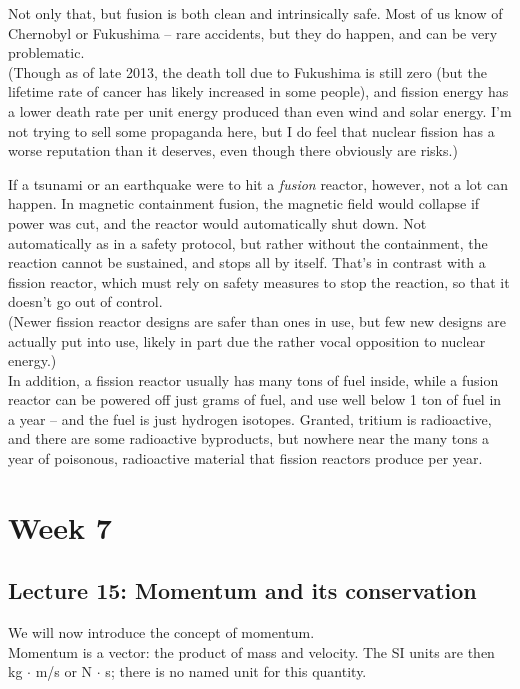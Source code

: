 \documentclass[12pt,a4paper]{report}
\begin{document}
Not only that, but fusion is both clean and intrinsically safe. Most of us know of Chernobyl or Fukushima -- rare accidents, but they do happen, and can be very problematic.\\
(Though as of late 2013, the death toll due to Fukushima is still zero (but the lifetime rate of cancer has likely increased in some people), and fission energy has a lower death rate per unit energy produced than even wind and solar energy. I'm not trying to sell some propaganda here, but I do feel that nuclear fission has a worse reputation than it deserves, even though there obviously are risks.)

If a tsunami or an earthquake were to hit a \emph{fusion} reactor, however, not a lot can happen. In magnetic containment fusion, the magnetic field would collapse if power was cut, and the reactor would automatically shut down. Not automatically as in a safety protocol, but rather without the containment, the reaction cannot be sustained, and stops all by itself. That's in contrast with a fission reactor, which must rely on safety measures to stop the reaction, so that it doesn't go out of control.\\
(Newer fission reactor designs are safer than ones in use, but few new designs are actually put into use, likely in part due the rather vocal opposition to nuclear energy.)\\
In addition, a fission reactor usually has many tons of fuel inside, while a fusion reactor can be powered off just grams of fuel, and use well below 1 ton of fuel in a year -- and the fuel is just hydrogen isotopes. Granted, tritium is radioactive, and there are some radioactive byproducts, but nowhere near the many tons a year of poisonous, radioactive material that fission reactors produce per year.

\chapter{Week 7}

\section{Lecture 15: Momentum and its conservation}

We will now introduce the concept of momentum.\\
Momentum is a vector: the product of mass and velocity. The SI units are then kg $\cdot$ m/s or N $\cdot$ s; there is no named unit for this quantity.
\end{document}
